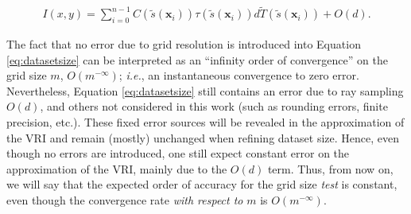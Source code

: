 %
%
\begin{eqnarray}
I(x,y) = \sum_{i = 0} ^ {n - 1} C( \tilde{s}( \mathbf{x}_i)) \tau(
\tilde{s}( \mathbf{x}_i)) d \tilde{T}(\tilde{s}(\mathbf{x}_i)) + O(d). \label{eq:datasetsize}
\end{eqnarray}


The fact that no error due to grid resolution is introduced 
into Equation \eqref{eq:datasetsize} can
be interpreted as an ``infinity order of convergence'' on the grid
size $m$, $O(m^{-\infty})$; {\em i.e.}, an instantaneous convergence to zero error.
%
Nevertheless, Equation \eqref{eq:datasetsize} still contains an error due 
to ray sampling $O(d)$, and others  not considered in this work 
(such as rounding errors, finite precision, etc.).  
These fixed error sources will be revealed in the approximation 
of the VRI and remain (mostly) unchanged when refining dataset size.
Hence, even though no errors are introduced, one still expect
constant error on the approximation of the VRI, mainly due to the $O(d)$ term. 
Thus, from now on, we will say that the expected order of accuracy for
the grid size \emph{test} is constant, even though the convergence rate \emph{with respect to}
$m$ is $O(m^{-\infty})$.

